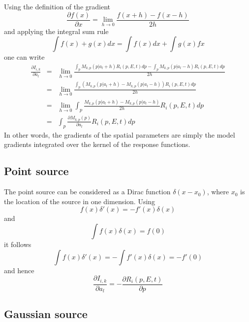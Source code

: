 \documentclass{article}[12pt,a4]
\begin{document}
Using the definition of the gradient
\begin{equation}
\frac{\partial f(x)}{\partial x} = \lim\limits_{h \rightarrow 0} \frac{f(x+h) - f(x-h)}{2h}
\end{equation}
and applying the integral sum rule
\begin{equation}
\int f(x) + g(x) dx = \int f(x) dx + \int g(x) fx
\end{equation}
one can write
\begin{eqnarray}
\frac{\partial I_{i,k}}{\partial a_l} & = & \lim\limits_{h \rightarrow 0} \frac{\int_p M_{k,p}(p|a_l + h) R_i(p,E,t) dp - \int_p M_{k,p}(p|a_l - h) R_i(p,E,t) dp}{2h} \\
& = & \lim\limits_{h \rightarrow 0} \frac{\int_p \left( M_{k,p}(p|a_l + h) - M_{k,p}(p|a_l - h) \right) R_i(p,E,t) dp}{2h} \\
& = & \lim\limits_{h \rightarrow 0} \int_p \frac{M_{k,p}(p|a_l + h) - M_{k,p}(p|a_l - h)}{2h} R_i(p,E,t) dp \\
& = & \int_p \frac{\partial M_{k,p}(p)}{\partial a_l} R_i(p,E,t) dp
\end{eqnarray}
In other words, the gradients of the spatial parameters are simply the model gradients integrated
over the kernel of the response functions.

\subsection{Point source}

The point source can be considered as a Dirac function $\delta(x-x_0)$, where $x_0$ is the
location of the source in one dimension.
Using
\begin{equation}
f(x) \delta'(x) = -f'(x) \delta(x)
\end{equation}
and
\begin{equation}
\int f(x) \delta(x) = f(0)
\end{equation}
it follows
\begin{equation}
\int f(x) \delta'(x) = -\int f'(x) \delta(x) = -f'(0)
\end{equation}
and hence
\begin{equation}
\frac{\partial I_{i,k}}{\partial a_l} = -\frac{\partial R_i(p,E,t)}{\partial p}
\end{equation}

\subsection{Gaussian source}
\end{document}
